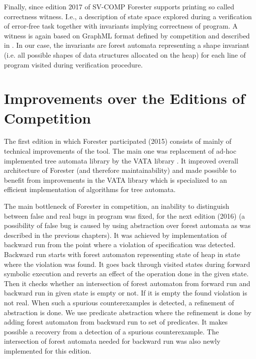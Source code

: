 {Finally, since edition 2017 of SV-COMP Forester supports printing so called correctness witness.
I.e., a description of state space explored during a verification of error-free task together with
invariants implying correctness of program.
A witness is again based on GraphML format defined by competition and described in \cite{fse16-correct}.
In our case, the invariants are forest automata representing a shape invariant (i.e. all possible shapes of data structures
allocated on the heap) for each line of program visited during verification procedure.

\section{Improvements over the Editions of Competition}
The first edition in which Forester participated (2015) consists of mainly of technical improvements of the tool.
The main one was replacement of ad-hoc implemented tree automata library by the VATA library \cite{libvata}.
It improved overall architecture of Forester (and therefore maintainability) and made possible
to benefit from improvements in the VATA library which is specialized to an efficient implementation of
algorithms for tree automata.

The main bottleneck of Forester in competition, an inability to distinguish between false and real bugs in program
was fixed, for the next edition (2016) (a possibility of false bug is caused by using abstraction over forest
automata as was described in the previous chapters).
It was achieved by implementation of backward run from the point where a violation of specification was detected.
Backward run starts with forest automaton representing state of heap in state where the violation was found.
It goes back through visited states during forward symbolic execution and reverts an effect of the operation done
in the given state.
Then it checks whether an intersection of forest automaton from forward run and backward run in given state is empty or not.
If it is empty the found violation is not real.
When such a spurious counterexamples is detected, a refinement of abstraction is done.
We use predicate abstraction where the refinement is done by adding forest automaton from backward run to set of predicates.
It makes possible a recovery from a detection of a spurious counterexample.
The intersection of forest automata needed for backward run was also newly implemented for this edition.

}
